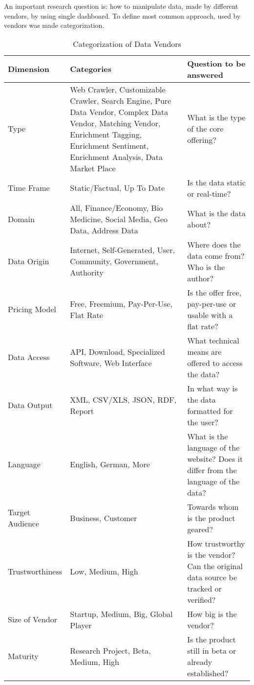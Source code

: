	An important research question is: how to manipulate data, made by different vendors, by using single dashboard. To define most common approach, used by vendors was made categorization\cite{schomm2013marketplaces}.
	\begin{table}[H]
	\centering
	\begin{tabular}{|L{2cm}|L{7cm}|L{6cm}|}
	\hline
	\textbf{Dimension} 			& \textbf{Categories} & \textbf{Question to be answered} \\
	\hline
	\hline 
	Type		                & Web Crawler, Customizable Crawler, Search Engine, Pure Data Vendor, Complex Data Vendor, Matching 
	                                   Vendor, Enrichment Tagging, Enrichment Sentiment, Enrichment Analysis, Data Market Place & What is the type of the core offering?  \\
	\hline
	Time Frame	                & Static/Factual, Up To Date & Is the data static or real-time?  \\
	\hline
	Domain		                & All, Finance/Economy, Bio Medicine, Social Media, Geo Data, Address Data & What is the data about?  \\
	\hline
	Data Origin                 & Internet, Self-Generated, User, Community, Government, Authority & Where does the data come 
	                                       from?Who is the author?  \\
	\hline
	Pricing Model		        & Free, Freemium, Pay-Per-Use, Flat Rate & Is the offer free, pay-per-use or usable with a flat rate? \\
	\hline
	Data Access		            & API, Download, Specialized Software, Web Interface & What technical means are offered to access the data? \\
	\hline
	Data Output		            & XML, CSV/XLS, JSON, RDF, Report& In what way is the data formatted for the user?  \\
	\hline
	Language 		            & English, German, More & What is the language of the website? Does it differ from the language of the 
	                                data? \\
	\hline 
	Target Audience		        & Business, Customer & Towards whom is the product geared?  \\
	\hline
	Trustworthiness	            & Low, Medium, High & How trustworthy is the vendor? Can the original data source be tracked or 
	                                 verified?  \\
	\hline 		
	Size of Vendor 		        & Startup, Medium, Big, Global Player & How big is the vendor?  \\
	\hline 
     Maturity                   & Research Project, Beta, Medium, High & Is the product still in beta or already established? \\
	\hline 
	\end{tabular}
	\caption[Categorization of Data Vendors]{Categorization of Data Vendors}
	\label{tab:categorization}
	\end{table}

